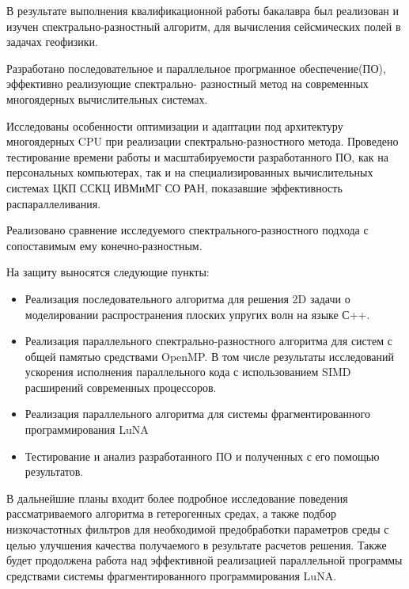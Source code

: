 
В результате выполнения квалификационной работы бакалавра был реализован и изучен спектрально-разностный алгоритм,
для вычисления сейсмических полей в задачах геофизики.

Разработано последовательное и параллельное прогрманное обеспечение(ПО), эффективно реализующие спектрально-
разностный метод на современных многоядерных вычислительных системах.

Исследованы особенности оптимизации и адаптации под архитектуру многоядерных CPU при реализации спектрально-разностного метода. Проведено тестирование времени работы и масштабируемости разработанного ПО, как на персональных компьютерах,
так и на специализированных вычислительных системах ЦКП ССКЦ ИВМиМГ СО РАН, показавшие эффективность распараллеливания.

Реализовано сравнение исследуемого спектрального-разностного подхода с сопоставимым ему конечно-разностным.

На защиту выносятся следующие пункты:

\begin{itemize}
    \item Реализация последовательного алгоритма для решения 2D задачи о моделировании
    распространения плоских упругих волн на языке С++.
    \item Реализация параллельного спектрально-разностного алгоритма для систем с общей памятью средствами OpenMP. В том числе
    результаты исследований ускорения исполнения параллельного кода с использованием SIMD расширений современных процессоров.
    \item Реализация параллельного алгоритма для системы фрагментированного программирования LuNA
    \item Тестирование и анализ разработанного ПО и полученных с его помощью результатов.
\end{itemize}

В дальнейшие планы входит более подробное исследование поведения рассматриваемого алгоритма в гетерогенных средах,
а также подбор низкочастотных фильтров для необходимой предобработки параметров среды с целью улучшения качества получаемого в результате расчетов решения.
Также будет продолжена работа над эффективной реализацией параллельной программы
средствами системы фрагментированного программирования LuNA.

\clearpage
